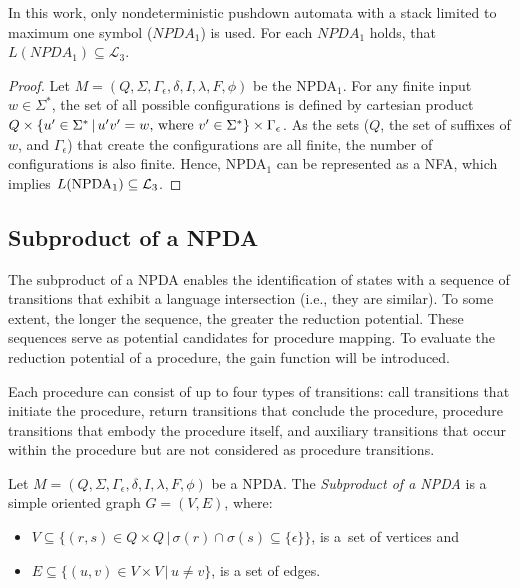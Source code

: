         In this work, only nondeterministic pushdown automata with a stack limited to maximum one symbol ($NPDA_1$) is used. For each $NPDA_1$ holds, that $L(NPDA_1) \subseteq \mathcal{L}_3$.
        \begin{proof}
            Let $M = (Q, \Sigma, \Gamma_\epsilon, \delta, I, \lambda, F, \phi)$ be the NPDA$_1$. For any finite input $w \in \Sigma^*$, the set of all possible configurations is defined by cartesian product $Q \times \{u' \in \Sigma^*\,|\, u'v' = w\textnormal{, where } v' \in \Sigma^*\} \times \Gamma_\epsilon$. As the sets ($Q$, the set of suffixes of $w$, and $\Gamma_\epsilon$) that create the configurations are all finite, the number of configurations is also finite. Hence, NPDA$_1$ can be represented as a NFA, which implies $L(\textnormal{NPDA}_1) \subseteq \mathcal{L}_3$.
        \end{proof}

    \subsection{Subproduct of a NPDA}
        The subproduct of a NPDA enables the identification of states with a sequence of transitions that exhibit a language intersection (i.e., they are similar). To some extent, the longer the sequence, the greater the reduction potential. These sequences serve as potential candidates for procedure mapping. To evaluate the reduction potential of a procedure, the gain function will be introduced.

        Each procedure can consist of up to four types of transitions: call transitions that initiate the procedure, return transitions that conclude the procedure, procedure transitions that embody the procedure itself, and auxiliary transitions that occur within the procedure but are not considered as procedure transitions.

        Let $M = (Q, \Sigma, \Gamma_\epsilon, \delta, I, \lambda, F, \phi)$ be a NPDA. The \textit{Subproduct of a NPDA} is a simple oriented graph $G = (V, E)$, where:
        \begin{itemize}
            \item $V \subseteq \{(r, s) \in Q \times Q\,|\, \sigma(r) \cap \sigma(s) \subseteq \{\epsilon\}\}$, is a~set of vertices and
            \item $E \subseteq \{(u, v) \in V \times V\,|\, u \neq v\}$, is a set of edges.
        \end{itemize}

